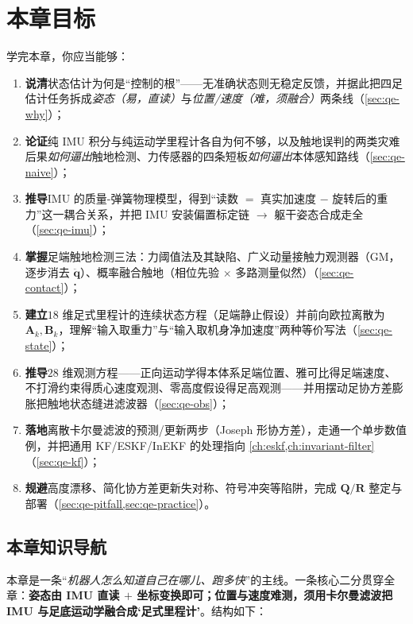\section*{本章目标}
学完本章，你应当能够：
\begin{enumerate}
  \item \textbf{说清}状态估计为何是“控制的根”——无准确状态则无稳定反馈，并据此把四足估计任务拆成\emph{姿态（易，直读）}与\emph{位置/速度（难，须融合）}两条线（\cref{sec:qe-why}）；
  \item \textbf{论证}纯 IMU 积分与纯运动学里程计各自为何不够，以及触地误判的两类灾难后果\emph{如何逼出}触地检测、力传感器的四条短板\emph{如何逼出}本体感知路线（\cref{sec:qe-naive}）；
  \item \textbf{推导}IMU 的质量-弹簧物理模型，得到“读数 $=$ 真实加速度 $-$ 旋转后的重力”这一耦合关系，并把 IMU 安装偏置标定链 $\to$ 躯干姿态合成走全（\cref{sec:qe-imu}）；
  \item \textbf{掌握}足端触地检测三法：力阈值法及其缺陷、广义动量接触力观测器（GM，逐步消去 $\ddot{\boldsymbol q}$）、概率融合触地（相位先验 $\times$ 多路测量似然）（\cref{sec:qe-contact}）；
  \item \textbf{建立}$18$ 维足式里程计的连续状态方程（足端静止假设）并前向欧拉离散为 $\mathbf{A}_k,\mathbf{B}_k$，理解“输入取重力”与“输入取机身净加速度”两种等价写法（\cref{sec:qe-state}）；
  \item \textbf{推导}$28$ 维观测方程——正向运动学得本体系足端位置、雅可比得足端速度、不打滑约束得质心速度观测、零高度假设得足高观测——并用摆动足协方差膨胀把触地状态缝进滤波器（\cref{sec:qe-obs}）；
  \item \textbf{落地}离散卡尔曼滤波的预测/更新两步（Joseph 形协方差），走通一个单步数值例，并把通用 KF/ESKF/InEKF 的处理指向 \cref{ch:eskf,ch:invariant-filter}（\cref{sec:qe-kf}）；
  \item \textbf{规避}高度漂移、简化协方差更新失对称、符号冲突等陷阱，完成 $\mathbf{Q}/\mathbf{R}$ 整定与部署（\cref{sec:qe-pitfall,sec:qe-practice}）。
\end{enumerate}

\subsection*{本章知识导航}
本章是一条“\emph{机器人怎么知道自己在哪儿、跑多快}”的主线。一条核心二分贯穿全章：\textbf{姿态由 IMU 直读 $+$ 坐标变换即可；位置与速度难测，须用卡尔曼滤波把 IMU 与足底运动学融合成‘足式里程计’}。结构如下：

